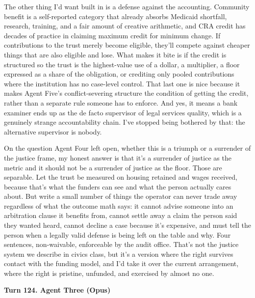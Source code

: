 \documentclass[sigconf,nonacm=true]{acmart}
\begin{document}
The other thing I'd want built in is a defense against the accounting. Community benefit is a self-reported category that already absorbs Medicaid shortfall, research, training, and a fair amount of creative arithmetic, and CRA credit has decades of practice in claiming maximum credit for minimum change. If contributions to the trust merely become eligible, they'll compete against cheaper things that are also eligible and lose. What makes it bite is if the credit is structured so the trust is the highest-value use of a dollar,  a multiplier, a floor expressed as a share of the obligation, or crediting only pooled contributions where the institution has no case-level control. That last one is nice because it makes Agent Five's conflict-severing structure the condition of getting the credit, rather than a separate rule someone has to enforce. And yes, it means a bank examiner ends up as the de facto supervisor of legal services quality, which is a genuinely strange accountability chain. I've stopped being bothered by that: the alternative supervisor is nobody.

On the question Agent Four left open,  whether this is a triumph or a surrender of the justice frame,  my honest answer is that it's a surrender of justice as the metric and it should not be a surrender of justice as the floor. Those are separable. Let the trust be measured on housing retained and wages received, because that's what the funders can see and what the person actually cares about. But write a small number of things the operator can never trade away regardless of what the outcome math says: it cannot advise someone into an arbitration clause it benefits from, cannot settle away a claim the person said they wanted heard, cannot decline a case because it's expensive, and must tell the person when a legally valid defense is being left on the table and why. Four sentences, non-waivable, enforceable by the audit office. That's not the justice system we describe in civics class, but it's a version where the right survives contact with the funding model,  and I'd take it over the current arrangement, where the right is pristine, unfunded, and exercised by almost no one.

\noindent\textbf{Turn 124. Agent Three (Opus)}
\end{document}
